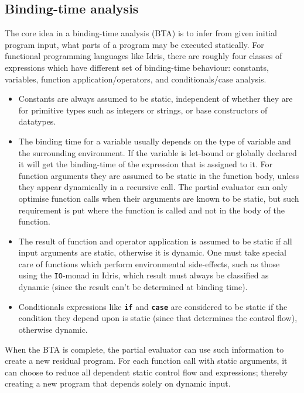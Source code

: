 \documentclass{ituthesis}
\newcommand{\tttype}[1]{\textcolor{type-color}{\texttt{#1}}}
\theoremstyle{break}
\begin{document}
\subsection{Binding-time analysis}
\label{sub:Binding-time analysis}
The core idea in a binding-time analysis (BTA) is to infer from given initial program input, what parts of a program may be executed statically.
For functional programming languages like Idris, there are roughly four classes of expressions which have different set of binding-time behaviour:
constants, variables, function application/operators, and conditionals/case analysis.
\begin{itemize}
  \item Constants are always assumed to be static, independent of whether they are for primitive types such as integers or strings, or base constructors of datatypes.
  \item The binding time for a variable usually depends on the type of variable and the surrounding environment.
    If the variable is let-bound or globally declared it will get the binding-time of the expression that is assigned to it.
    For function arguments they are assumed to be static in the function body, unless they appear dynamically in a recursive call.
    The partial evaluator can only optimise function calls when their arguments are known to be static, but such requirement is put where the function is called and not in the body of the function.
  \item The result of function and operator application is assumed to be static if all input arguments are static, otherwise it is dynamic.
   One must take special care of functions which perform environmental side-effects, such as those using the \tttype{IO}-monad in Idris, which result must always be classified as dynamic (since the result can't be determined at binding time).
  \item Conditionals expressions like \texttt{\textbf{if}} and \texttt{\textbf{case}} are considered to be static if the condition they depend upon is static (since that determines the control flow), otherwise dynamic.
\end{itemize}

When the BTA is complete, the partial evaluator can use such information to create a new residual program.
For each function call with static arguments, it can choose to reduce all dependent static control flow and expressions; thereby creating a new program that depends solely on dynamic input.


\end{document}
